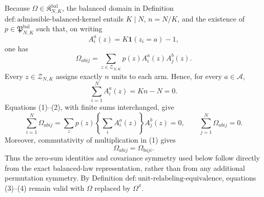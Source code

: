 Because \(\Omega\in\mathfrak K^{\mathrm{bal}}_{N,K}\), the balanced domain in Definition \(\mathrm{def{:}admissible\text{-}balanced\text{-}kernel}\) entails \(K\mid N\), \(n=N/K\), and the existence of \(p\in\mathfrak P^{\mathrm{bal}}_{N,K}\) such that, on writing
\[
 A_i^a(z)=K\mathbf 1(z_i=a)-1,
\]
one has
\[
 \Omega_{abij}=\sum_{z\in\mathcal Z_{N,K}}p(z)A_i^a(z)A_j^b(z). \tag{1}
\]
Every \(z\in\mathcal Z_{N,K}\) assigns exactly \(n\) units to each arm.  Hence, for every \(a\in\mathcal A\),
\[
 \sum_{i=1}^N A_i^a(z)=Kn-N=0. \tag{2}
\]
Equations (1)--(2), with finite sums interchanged, give
\[
 \sum_{i=1}^N\Omega_{abij}
 =\sum_zp(z)\left\{\sum_iA_i^a(z)\right\}A_j^b(z)=0,
 \qquad
 \sum_{j=1}^N\Omega_{abij}=0. \tag{3}
\]
Moreover, commutativity of multiplication in (1) gives
\[
 \Omega_{abij}=\Omega_{baji}. \tag{4}
\]
Thus the zero-sum identities and covariance symmetry used below follow directly from the exact balanced-law representation, rather than from any additional permutation symmetry.  By Definition \(\mathrm{def{:}unit\text{-}relabeling\text{-}equivalence}\), equations (3)--(4) remain valid with \(\Omega\) replaced by \(\Omega^\pi\).

